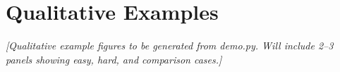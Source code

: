 \section{Qualitative Examples}
\label{sec:results_qualitative}





\textit{[Qualitative example figures to be generated from demo.py. Will include 2--3 panels showing easy, hard, and comparison cases.]}


